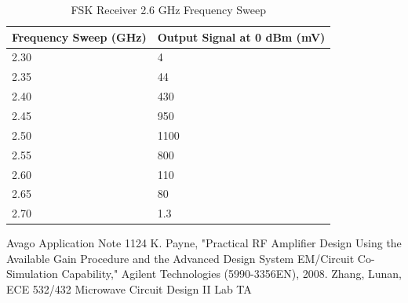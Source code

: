 \documentclass[conference]{IEEEtran}
\begin{document}
\begin{table}
\caption{FSK Receiver 2.6 GHz Frequency Sweep}
    \begin{tabular}{|l|l|}
    \hline
    Frequency Sweep (GHz) & Output Signal at 0 dBm (mV) \\ \hline
    2.30                  & 4                           \\ \hline
    2.35                  & 44                          \\ \hline
    2.40                  & 430                         \\ \hline
    2.45                  & 950                         \\ \hline
    2.50                  & 1100                        \\ \hline
    2.55                  & 800                         \\\hline
    2.60                  & 110                         \\ \hline
    2.65                  & 80                          \\\hline
    2.70                  & 1.3                         \\\hline
    \end{tabular}
\label{tab:fsk26}
\end{table}

\begin{thebibliography}{1}
Avago Application Note 1124
K. Payne, "Practical RF Amplifier Design Using the Available Gain Procedure and the Advanced Design System EM/Circuit Co-Simulation Capability," Agilent Technologies (5990-3356EN), 2008.
Zhang, Lunan, ECE 532/432 Microwave Circuit Design II Lab TA
\end{thebibliography}
\end{document}
